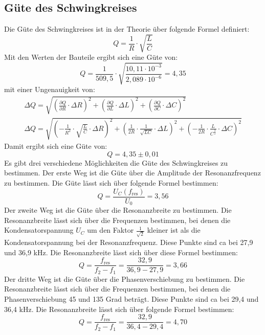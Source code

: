 \subsection{Güte des Schwingkreises}
Die Güte des Schwingkreises ist in der Theorie über folgende Formel definiert:
\begin{equation}
    Q = \frac{1}{R} \cdot \sqrt{\frac{L}{C}}
\end{equation}
Mit den Werten der Bauteile ergibt sich eine Güte von:
\begin{equation}
    Q = \frac{1}{509,5} \cdot \sqrt{\frac{10,11 \cdot 10^{-3}}{2,089 \cdot 10^{-6}}} = 4,35
\end{equation}
mit einer Ungenauigkeit von:
\begin{gather}
    \Delta Q = \sqrt{(\frac{\partial Q}{\partial R} \cdot \Delta R)^2 + (\frac{\partial Q}{\partial L} \cdot \Delta L)^2 + (\frac{\partial Q}{\partial C} \cdot \Delta C)^2}\\
    \Delta Q = \sqrt{(-\frac{1}{R^2} \cdot \sqrt{\frac{L}{C}} \cdot \Delta R)^2 + (\frac{1}{2 R} \cdot \frac{1}{\sqrt{L C}} \cdot \Delta L)^2 + (-\frac{1}{2 R} \cdot \frac{L}{C^{\frac{3}{2}}} \cdot \Delta C)^2}
\end{gather}
Damit ergibt sich eine Güte von:
\begin{equation}
    Q = 4,35 \pm 0,01
\end{equation}
Es gibt drei verschiedene Möglichkeiten die Güte des Schwingkreises zu bestimmen.
Der erste Weg ist die Güte über die Amplitude der Resonanzfrequenz zu bestimmen. Die Güte lässt sich über folgende Formel bestimmen:
\begin{equation}
    Q = \frac{U_C(f_{\text{res}})}{U_0} = 3,56
\end{equation}
Der zweite Weg ist die Güte über die Resonanzbreite zu bestimmen. Die Resonanzbreite lässt sich über die Frequenzen bestimmen, bei denen die Kondensatorspannung $U_C$ um den Faktor $\frac{1}{\sqrt{2}}$ kleiner ist als die Kondensatorspannung bei der Resonanzfrequenz.
Diese Punkte sind ca bei 27,9 und 36,9 kHz. Die Resonanzbreite lässt sich über diese Formel bestimmen:
\begin{equation}
    Q = \frac{f_{\text{res}}}{f_2 - f_1} = \frac{32,9}{36,9 - 27,9} = 3,66
\end{equation}
Der dritte Weg ist die Güte über die Phasenverschiebung zu bestimmen. Die Resonanzbreite lässt sich über die Frequenzen bestimmen, 
bei denen die Phasenverschiebung 45 und 135 Grad beträgt. 
Diese Punkte sind ca bei 29,4 und 36,4 kHz. Die Resonanzbreite lässt sich über folgende Formel bestimmen:
\begin{equation}
    Q = \frac{f_{\text{res}}}{f_2 - f_1} = \frac{32,9}{36,4 - 29,4} = 4,70
\end{equation}

